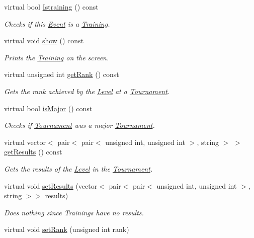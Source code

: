 \begin{DoxyCompactItemize}
virtual bool \hyperlink{class_training_ab70fe087f382d0de9dca69ce519be91e}{Istraining} () const
\begin{DoxyCompactList}\small\item\em Checks if this \hyperlink{class_event}{Event} is a \hyperlink{class_training}{Training}. \end{DoxyCompactList}\item 
virtual void \hyperlink{class_training_a9391fa1f4862855341d6243e75f9efef}{show} () const
\begin{DoxyCompactList}\small\item\em Prints the \hyperlink{class_training}{Training} on the screen. \end{DoxyCompactList}\item 
virtual unsigned int \hyperlink{class_training_ada723ff1f8340338a99e720a1b472334}{get\+Rank} () const
\begin{DoxyCompactList}\small\item\em Gets the rank achieved by the \hyperlink{class_level}{Level} at a \hyperlink{class_tournament}{Tournament}. \end{DoxyCompactList}\item 
virtual bool \hyperlink{class_training_aaf1c4d96664a16ca141dd5a3582f9426}{is\+Major} () const
\begin{DoxyCompactList}\small\item\em Checks if \hyperlink{class_tournament}{Tournament} was a major \hyperlink{class_tournament}{Tournament}. \end{DoxyCompactList}\item 
virtual vector$<$ pair$<$ pair$<$ unsigned int, unsigned int $>$, string $>$ $>$ \hyperlink{class_training_aa37e2baeee2b94cb15521e1768b99cc9}{get\+Results} () const
\begin{DoxyCompactList}\small\item\em Gets the results of the \hyperlink{class_level}{Level} in the \hyperlink{class_tournament}{Tournament}. \end{DoxyCompactList}\item 
virtual void \hyperlink{class_training_ad587b59c44a6e95a4e52f3d3f6b89480}{set\+Results} (vector$<$ pair$<$ pair$<$ unsigned int, unsigned int $>$, string $>$$>$ results)
\begin{DoxyCompactList}\small\item\em Does nothing since Trainings have no results. \end{DoxyCompactList}\item 
virtual void \hyperlink{class_training_a15d38322bd6a2ee8e17441bd4798b236}{set\+Rank} (unsigned int rank)
$$
\end{DoxyCompactItemize}
